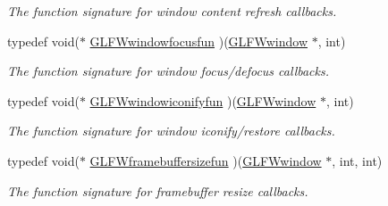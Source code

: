 \begin{CompactItemize}
\begin{CompactList}\small\item\em The function signature for window content refresh callbacks. \item\end{CompactList}\item 
typedef void($\ast$ \hyperlink{group__window_g6b5f973531ea91663ad707ba4f2ac104}{GLFWwindowfocusfun} )(\hyperlink{group__window_g3c96d80d363e67d13a41b5d1821f3242}{GLFWwindow} $\ast$, int)
\begin{CompactList}\small\item\em The function signature for window focus/defocus callbacks. \item\end{CompactList}\item 
typedef void($\ast$ \hyperlink{group__window_ge47ae066eea9fe6050a62360928ae524}{GLFWwindowiconifyfun} )(\hyperlink{group__window_g3c96d80d363e67d13a41b5d1821f3242}{GLFWwindow} $\ast$, int)
\begin{CompactList}\small\item\em The function signature for window iconify/restore callbacks. \item\end{CompactList}\item 
typedef void($\ast$ \hyperlink{group__window_g311bb32e578aa240b6464af494debffc}{GLFWframebuffersizefun} )(\hyperlink{group__window_g3c96d80d363e67d13a41b5d1821f3242}{GLFWwindow} $\ast$, int, int)
\begin{CompactList}\small\item\em The function signature for framebuffer resize callbacks. \item\end{CompactList}\end{CompactItemize}
